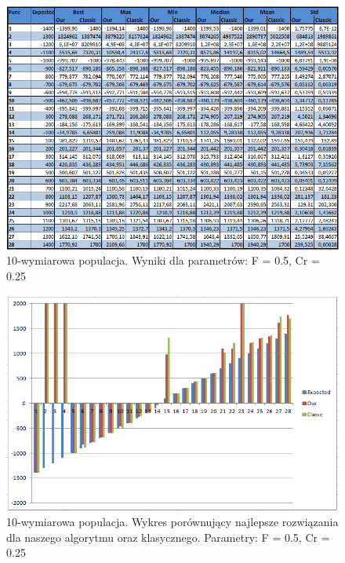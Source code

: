 \documentclass[a4paper]{article}
\begin{document}
\begin{figure}[!h]
\centering
\includegraphics[width=\textwidth]{F5Cr25L10tab.png}
\caption{10-wymiarowa populacja. Wyniki dla parametrów: F = 0.5, Cr = 0.25}
\end{figure}

\begin{figure}[!h]
\centering
\includegraphics[width=\textwidth]{F5Cr25L10chart.png}
\caption{10-wymiarowa populacja. Wykres porównujący najlepsze rozwiązania dla naszego algorytmu oraz klasycznego. Parametry: F = 0.5, Cr = 0.25}
\end{figure}
\end{document}
